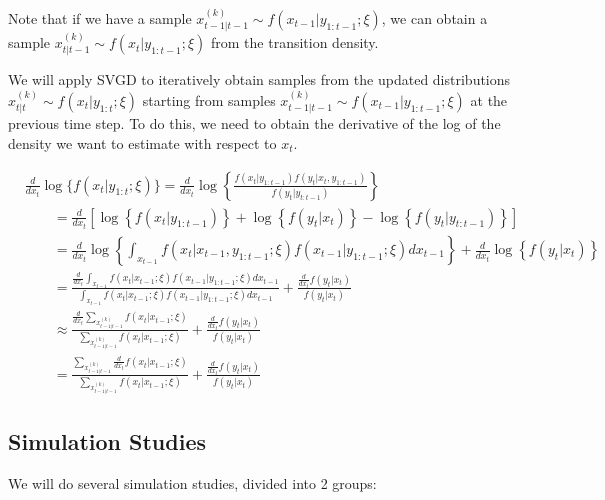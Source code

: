\documentclass[]{article}
\begin{document}
Note that if we have a sample
\(x_{t-1|t-1}^{(k)} \sim f(x_{t-1} \vert y_{1:t-1} ;\xi)\), we can
obtain a sample \(x_{t|t-1}^{(k)} \sim f(x_t \vert y_{1:t-1} ;\xi)\)
from the transition density.

We will apply SVGD to iteratively obtain samples from the updated
distributions \(x_{t|t}^{(k)} \sim f(x_{t} \vert y_{1:t} ;\xi)\)
starting from samples
\(x_{t-1|t-1}^{(k)} \sim f(x_{t-1} \vert y_{1:t-1} ;\xi)\) at the
previous time step. To do this, we need to obtain the derivative of the
log of the density we want to estimate with respect to \(x_{t}\).

\begin{align*}
&\frac{d}{d x_t} \log\{f(x_{t} \vert y_{1:t}; \xi)\} = \frac{d}{d x_t} \log\left\{\frac{f(x_t \vert y_{1:t-1}) f(y_t \vert x_t, y_{1:t-1})}{f(y_t \vert y_{t:t-1})}\right\} \\
&\qquad = \frac{d}{d x_t} \left[ \log\left\{f(x_t \vert y_{1:t-1})\right\} + \log \left\{f(y_t \vert x_t)\right\} - \log\left\{f(y_t \vert y_{t:t-1})\right\} \right] \\
&\qquad = \frac{d}{d x_t} \log\left\{\int_{x_{t-1}}f(x_{t} \vert x_{t-1}, y_{1:t-1}; \xi)f(x_{t-1} \vert y_{1:t-1}; \xi) d x_{t-1} \right\} + \frac{d}{d x_t} \log \left\{ f(y_t \vert x_t) \right\} \\
&\qquad = \frac{\frac{d}{d x_t} \int_{x_{t-1}}f(x_{t} \vert x_{t-1}; \xi)f(x_{t-1} \vert y_{1:t-1}; \xi) d x_{t-1}}{\int_{x_{t-1}}f(x_{t} \vert x_{t-1}; \xi)f(x_{t-1} \vert y_{1:t-1}; \xi) d x_{t-1}} + \frac{\frac{d}{d x_t} f(y_t \vert x_t)}{f(y_t \vert x_t)} \\
&\qquad \approx \frac{\frac{d}{d x_t} \sum_{x_{t-1|t-1}^{(k)}}f(x_{t} \vert x_{t-1}; \xi)}{\sum_{x_{t-1|t-1}^{(k)}}f(x_{t} \vert x_{t-1}; \xi)} + \frac{\frac{d}{d x_t} f(y_t \vert x_t)}{f(y_t \vert x_t)} \\
&\qquad = \frac{\sum_{x_{t-1|t-1}^{(k)}} \frac{d}{d x_t} f(x_{t} \vert x_{t-1}; \xi)}{\sum_{x_{t-1|t-1}^{(k)}}f(x_{t} \vert x_{t-1}; \xi)} + \frac{\frac{d}{d x_t} f(y_t \vert x_t)}{f(y_t \vert x_t)}
\end{align*}

\subsection{Simulation Studies}\label{simulation-studies}

We will do several simulation studies, divided into 2 groups:
\end{document}
